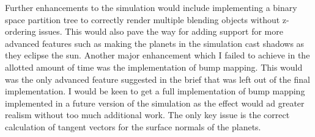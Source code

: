 \documentclass[conference]{IEEEtran}
\begin{document}
Further enhancements to the simulation would include implementing a binary space partition tree to correctly render multiple blending objects without z-ordering issues. This would also pave the way for adding support for more advanced features such as making the planets in the simulation cast shadows as they eclipse the sun. Another major enhancement which I failed to achieve in the allotted amount of time was the implementation of bump mapping. This would was the only advanced feature suggested in the brief that was left out of the final implementation. I would be keen to get a full implementation of bump mapping implemented in a future version of the simulation as the effect would ad greater realism without too much additional work. The only key issue is the correct calculation of tangent vectors for the surface normals of the planets.



\end{document}
